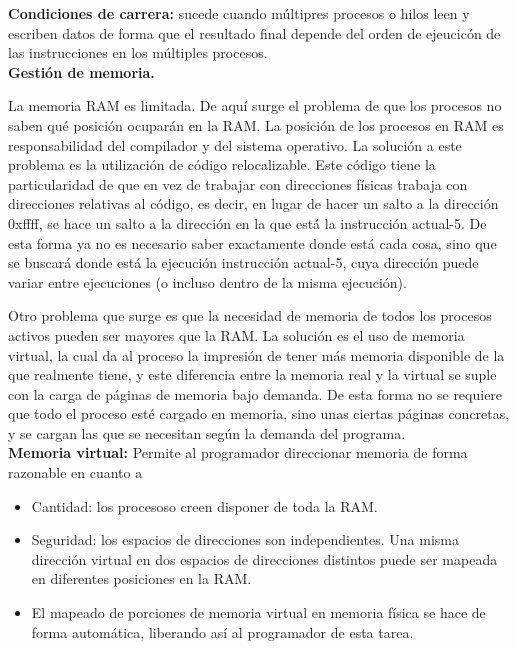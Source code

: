 \documentclass{article}
\begin{document}
\textbf{Condiciones de carrera:} sucede cuando múltipres procesos o hilos leen y escriben datos de forma que el resultado final depende del orden de ejeucicón de las instrucciones en los múltiples procesos.\\

\textbf{Gestión de memoria.}

La memoria RAM es limitada. De aquí surge el problema de que los procesos no saben qué posición ocuparán en la RAM. La posición de los procesos en RAM es responsabilidad del compilador y del sistema operativo. La solución a este problema es la utilización de código relocalizable. Este código tiene la particularidad de que en vez de trabajar con direcciones físicas trabaja con direcciones relativas al código, es decir, en lugar de hacer un salto a la dirección 0xffff, se hace un salto a la dirección en la que está la instrucción actual-5. De esta forma ya no es necesario saber exactamente donde está cada cosa, sino que se buscará donde está la ejecución instrucción actual-5, cuya dirección puede variar entre ejecuciones (o incluso dentro de la misma ejecución). 

Otro problema que surge es que la necesidad de memoria de todos los procesos activos pueden ser mayores que la RAM. La solución es el uso de memoria virtual, la cual da al proceso la impresión de tener más memoria disponible de la que realmente tiene, y este diferencia entre la memoria real y la virtual se suple con la carga de páginas de memoria bajo demanda. De esta forma no se requiere que todo el proceso esté cargado en memoria, sino unas ciertas páginas concretas, y se cargan las que se necesitan según la demanda del programa.\\

\textbf{Memoria virtual:} Permite al programador direccionar memoria de forma razonable en cuanto a

\begin{itemize}
\item Cantidad: los procesoso creen disponer de toda la RAM.

\item Seguridad: los espacios de direcciones son independientes. Una misma dirección virtual en dos espacios de direcciones distintos puede ser mapeada en diferentes posiciones en la RAM.

\item El mapeado de porciones de memoria virtual en memoria física se hace de forma automática, liberando así al programador de esta tarea.
\end{itemize}
\end{document}
